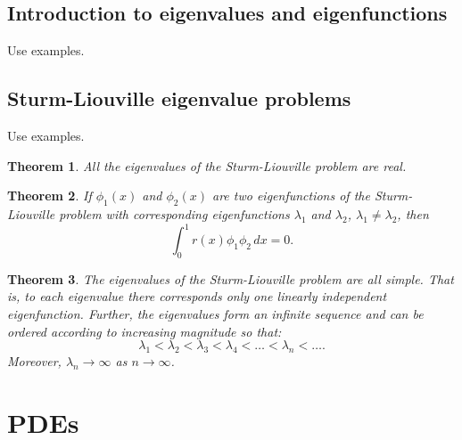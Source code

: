 \documentclass{article}
\newtheorem{theorem}{Theorem}
\begin{document}
\subsection{Introduction to eigenvalues and eigenfunctions}
Use examples.

\subsection{Sturm-Liouville eigenvalue problems}
Use examples.

\begin{theorem}
    All the eigenvalues of the Sturm-Liouville problem are real.
\end{theorem}

\begin{theorem}
    If $\phi_1(x)$ and $\phi_2(x)$ are two eigenfunctions of the Sturm-Liouville problem with corresponding eigenfunctions $\lambda_1$ and $\lambda_2$, $\lambda_1\neq \lambda_2$, then
    \begin{equation}
        \int_0^1 r(x)\phi_1 \phi_2\,dx=0.
    \end{equation}
\end{theorem}
\begin{theorem}
    The eigenvalues of the Sturm-Liouville problem are all simple. That is, to each eigenvalue there corresponds only one linearly independent eigenfunction. Further, the eigenvalues form an infinite sequence and can be ordered according to increasing magnitude so that:
    \begin{equation}
        \lambda_1<\lambda_2<\lambda_3<\lambda_4<\ldots<\lambda_n<\ldots.
    \end{equation}
    Moreover, $\lambda_n\to\infty$ as $n\to\infty$.
\end{theorem}

\section{PDEs}
\end{document}
